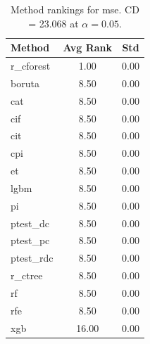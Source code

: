 \begin{table}[h]
\centering
\caption{Method rankings for mse. CD = 23.068 at $\alpha=0.05$.}
\label{tab:ranks_mse}
\begin{tabular}{lcc}
\toprule
Method & Avg Rank & Std \\
\midrule
r_cforest & 1.00 & 0.00 \\
boruta & 8.50 & 0.00 \\
cat & 8.50 & 0.00 \\
cif & 8.50 & 0.00 \\
cit & 8.50 & 0.00 \\
cpi & 8.50 & 0.00 \\
et & 8.50 & 0.00 \\
lgbm & 8.50 & 0.00 \\
pi & 8.50 & 0.00 \\
ptest_dc & 8.50 & 0.00 \\
ptest_pc & 8.50 & 0.00 \\
ptest_rdc & 8.50 & 0.00 \\
r_ctree & 8.50 & 0.00 \\
rf & 8.50 & 0.00 \\
rfe & 8.50 & 0.00 \\
xgb & 16.00 & 0.00 \\
\bottomrule
\end{tabular}
\end{table}